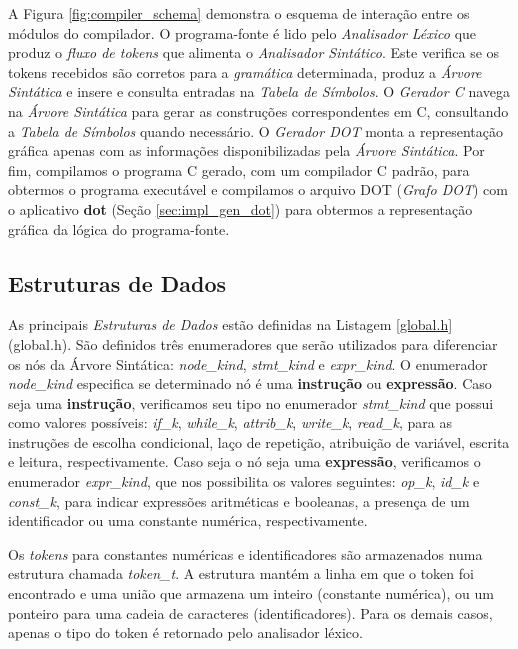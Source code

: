A Figura \ref{fig:compiler_schema} demonstra o esquema de interação entre
os módulos do compilador. O programa-fonte é lido pelo \emph{Analisador
Léxico} que produz o \emph{fluxo de tokens} que alimenta o \emph{Analisador
Sintático}. Este verifica se os tokens recebidos são corretos para a
\emph{gramática} determinada, produz a \emph{Árvore Sintática} e insere e
consulta entradas na \emph{Tabela de Símbolos}. O \emph{Gerador C} navega
na \emph{Árvore Sintática} para gerar as construções correspondentes
em C, consultando a \emph{Tabela de Símbolos} quando necessário.
O \emph{Gerador DOT} monta a representação gráfica apenas com as
informações disponibilizadas pela \emph{Árvore Sintática}. Por fim,
compilamos o programa C gerado, com um compilador C padrão, para obtermos
o programa executável e compilamos o arquivo DOT (\emph{Grafo DOT}) com o
aplicativo \textbf{dot} (Seção \ref{sec:impl_gen_dot}) para obtermos a
representação gráfica da lógica do programa-fonte.

\subsection{Estruturas de Dados}
As principais \emph{Estruturas de Dados} estão definidas na Listagem
\ref{global.h} (global.h). São definidos três enumeradores que serão
utilizados para diferenciar os nós da Árvore Sintática: \emph{node\_kind},
\emph{stmt\_kind} e \emph{expr\_kind}. O enumerador \emph{node\_kind}
especifica se determinado nó é uma \textbf{instrução} ou \textbf{expressão}.
Caso seja uma \textbf{instrução}, verificamos seu tipo no enumerador
\emph{stmt\_kind} que possui como valores possíveis: \emph{if\_k},
\emph{while\_k}, \emph{attrib\_k}, \emph{write\_k}, \emph{read\_k}, para as
instruções de escolha condicional, laço de repetição, atribuição de variável,
escrita e leitura, respectivamente. Caso seja o nó seja uma
\textbf{expressão}, verificamos o enumerador \emph{expr\_kind}, que nos
possibilita os valores seguintes: \emph{op\_k}, \emph{id\_k} e
\emph{const\_k}, para indicar expressões aritméticas e booleanas, a presença
de um identificador ou uma constante numérica, respectivamente.

Os \emph{tokens} para constantes numéricas e identificadores são armazenados
numa estrutura chamada \emph{token\_t}. A estrutura mantém a linha em que o token
foi encontrado e uma união que armazena um inteiro (constante numérica), ou um
ponteiro para uma cadeia de caracteres (identificadores). Para os demais
casos, apenas o tipo do token é retornado pelo analisador léxico.

